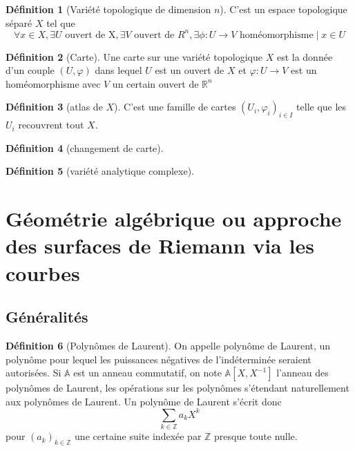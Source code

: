 \documentclass{article}
\newcommand{\R}{\mathbb{R}} %
\newcommand{\A}{\mathbb{A}} %
\newcommand{\Z}{\mathbb{Z}} %
\theoremstyle{definition} %
\newtheorem{defi}{Définition}
\newcommand{\1}{\mathbb{1}} %
\begin{document}
\begin{defi}[Variété topologique de dimension $n$]
C'est un espace topologique séparé $X$ tel que 
$$\forall x \in X, \exists U \text{ ouvert de X}, \exists V \text{ ouvert de } R^n, \exists \phi : U \to V \text{ homéomorphisme} \mid x \in U $$

\end{defi}

\begin{defi}[Carte]
Une carte sur une variété topologique $X$ est la donnée d'un couple $(U,\varphi)$ dans lequel $U$ est un ouvert de $X$ et $\varphi : U \to V$ est un homéomorphisme avec $V$ un certain ouvert de $\R^n$ 
\end{defi}

\begin{defi}[atlas de $X$]
C'est une famille de cartes $(U_i , \varphi_i)_{i \in I}$ telle que les $U_i$ recouvrent tout $X$.
\end{defi}

\begin{defi}[changement de carte]

\end{defi}



\begin{defi}[variété analytique complexe]

\end{defi}

\section{Géométrie algébrique ou approche des surfaces de Riemann via les courbes}

\subsection{Généralités}

\begin{defi}[Polynômes de Laurent]
On appelle polynôme de Laurent, un polynôme pour lequel les puissances négatives de l'indéterminée seraient autorisées.
Si $\A$ est un anneau commutatif, on note $\A[X,X^{-1}]$ l'anneau des polynômes de Laurent, les opérations sur les polynômes s'étendant naturellement aux polynômes de Laurent.
Un polynôme de Laurent s'écrit donc 
$$\sum_{k \in \Z} a_k X^k $$ pour $(a_k)_{k \in \Z}$ une certaine suite indexée par $\Z$ presque toute nulle.
\end{defi}
\end{document}

